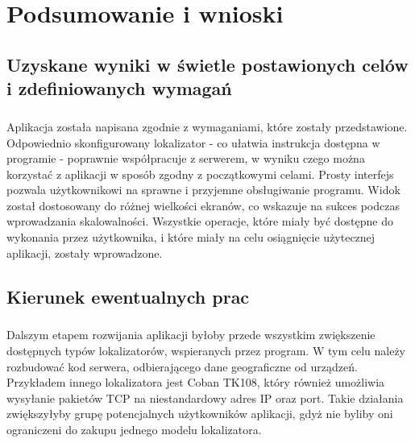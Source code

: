 \chapter{Podsumowanie i wnioski}

\section{Uzyskane wyniki w świetle postawionych celów i zdefiniowanych wymagań}
\paragraph{}
Aplikacja została napisana zgodnie z wymaganiami, które zostały przedstawione. Odpowiednio skonfigurowany lokalizator - co ułatwia instrukcja dostępna w programie - poprawnie współpracuje z serwerem, w wyniku czego można korzystać z aplikacji w sposób zgodny z początkowymi celami. Prosty interfejs pozwala użytkownikowi na sprawne i przyjemne obsługiwanie programu. Widok został dostosowany do różnej wielkości ekranów, co wskazuje na sukces podczas wprowadzania skalowalności. Wszystkie operacje, które miały być dostępne do wykonania przez użytkownika, i które miały na celu osiągnięcie użytecznej aplikacji, zostały wprowadzone.

\section{Kierunek ewentualnych prac}
\paragraph{}
Dalszym etapem rozwijania aplikacji byłoby przede wszystkim zwiększenie dostępnych typów lokalizatorów, wspieranych przez program. W tym celu należy rozbudować kod serwera, odbierającego dane geograficzne od urządzeń. Przykładem innego lokalizatora jest Coban TK108, który również umożliwia wysyłanie pakietów TCP na niestandardowy adres IP oraz port. Takie działania zwiększyłyby grupę potencjalnych użytkowników aplikacji, gdyż nie byliby oni ograniczeni do zakupu jednego modelu lokalizatora.
